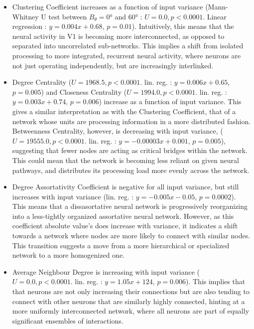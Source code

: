 \begin{itemize}
    \item Clustering Coefficient increases as a function of input variance (Mann-Whitney U test between $B_\theta = 0$° and $60$° : $U=0.0, p<0.0001$. Linear regression : $y = 0.004x+0.68$, $p = 0.01$).
    Intuitively, this means that the neural activity in \gls{V1} is becoming more interconnected, as opposed to separated into uncorrelated sub-networks. This implies a shift from isolated processing to more integrated, recurrent neural activity, where neurons are not just operating independently, but are increasingly interlinked.
    
    \item Degree Centrality ($U=1968.5, p<0.0001$. lin. reg. : $y = 0.006x+0.65$, $p = 0.005$) and Closeness Centrality ($U=1994.0, p<0.0001$. lin. reg. : $y = 0.003x+0.74$, $p = 0.006$) increase as a function of input variance.
    This gives a similar interpretation as with the Clustering Coefficient, that of a network whose units are processing information in a more distributed fashion. Betweenness Centrality, however, is decreasing with input variance, ($U=19555.0, p<0.0001$. lin. reg. : $y = -0.00003x+0.001$, $p = 0.005$), suggesting that fewer nodes are acting as critical bridges within the network. This could mean that the network is becoming less reliant on given neural pathways, and distributes its processing load more evenly across the network.
    
    \item Degree Assortativity Coefficient is negative for all input variance, but still increases with input variance (lin. reg. : $y = -0.005x-0.05$, $p = 0.0002$).
    This means that a dissasortative neural network is progressively reorganizing into a less-tightly organized assortative neural network. However, as this coefficient absolute value's does increase with variance, it indicates a shift towards a network where nodes are more likely to connect with similar nodes. This transition suggests a move from a more hierarchical or specialized network to a more homogenized one.
    
    \item Average Neighbour Degree is increasing with input variance ($U=0.0, p<0.0001$. lin. reg. : $y = 1.05x+124$, $p = 0.006$). This implies that that neurons are not only increasing their connections but are also tending to connect with other neurons that are similarly highly connected, hinting at a more uniformly interconnected network, where all neurons are part of equally significant ensembles of interactions.
    

\end{itemize}
